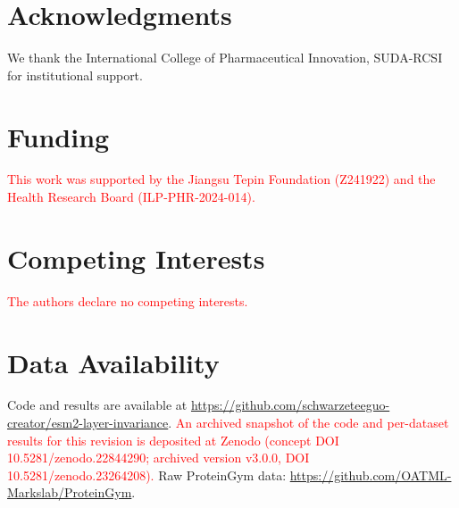 \documentclass[numbered,webpdf,modern,large]{oup-authoring-template}
\newcommand{\rev}[1]{\textcolor{red}{#1}}
\begin{document}
\section*{Acknowledgments}
We thank the International
College of Pharmaceutical Innovation, SUDA-RCSI for institutional support.

\section*{Funding}
\rev{This work was supported by the Jiangsu Tepin Foundation (Z241922) and
the Health Research Board (ILP-PHR-2024-014).}

\section*{Competing Interests}
\rev{The authors declare no competing interests.}

\section*{Data Availability}
Code and results are available at \url{https://github.com/schwarzeteeguo-creator/esm2-layer-invariance}.
\rev{An archived snapshot of the code and per-dataset results for this
revision is deposited at Zenodo (concept DOI
10.5281/zenodo.22844290; archived version v3.0.0, DOI 10.5281/zenodo.23264208).}
Raw ProteinGym data: \url{https://github.com/OATML-Markslab/ProteinGym}.
\end{document}
